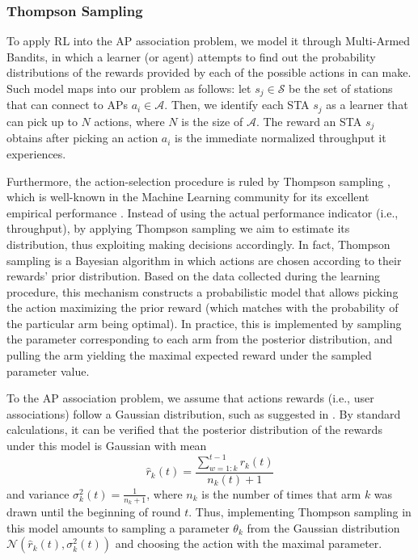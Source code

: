 \documentclass{article}
\begin{document}
		\subsubsection{Thompson Sampling}
		\label{section:thompson}			
			To apply RL into the AP association problem, we model it through Multi-Armed Bandits, in which a learner (or agent) attempts to find out the probability distributions of the rewards provided by each of the possible actions in can make. Such model maps into our problem as follows: let $s_j \in \mathcal{S}$ be the set of stations that can connect to APs $a_i \in \mathcal{A}$. Then, we identify each STA $s_j$ as a learner that can pick up to $N$ actions, where $N$ is the size of $\mathcal{A}$. The reward an STA $s_j$ obtains after picking an action $a_i$ is the immediate normalized throughput it experiences. 
			
			Furthermore, the action-selection procedure is ruled by Thompson sampling \cite{thompson1933likelihood}, which is well-known in the Machine Learning community for its excellent empirical performance \cite{CL11}. Instead of using the actual performance indicator (i.e., throughput), by applying Thompson sampling  we aim to estimate its distribution, thus exploiting making decisions accordingly. In fact, Thompson sampling is a Bayesian algorithm in which actions are chosen according to their rewards' prior distribution. Based on the data collected during the learning procedure, this mechanism constructs a probabilistic model that allows picking the action maximizing the prior reward (which matches with the probability of the particular arm being optimal). In practice, this is implemented by sampling the parameter corresponding to each arm from the posterior distribution, and pulling the arm yielding the maximal expected reward under the sampled parameter value.
			 
			To the AP association problem, we assume that actions rewards (i.e., user associations) follow a Gaussian distribution, such as suggested in \cite{agrawal2013further}. By standard calculations, it can be verified that the posterior distribution of the rewards under this model is Gaussian with mean 
			\begin{equation}
				\hat{r}_k(t) = \frac{\sum_{w=1:k}^{t-1} r_k(t) }{n_k(t) + 1}
				\nonumber
			\end{equation}
			and variance $\sigma_k^2(t) = \frac{1}{n_k + 1}$, where $n_k$ is the number of times that arm $k$ was drawn until the beginning of round $t$. Thus, implementing Thompson sampling in this model amounts to sampling a parameter $\theta_k$ from the Gaussian distribution $\mathcal{N}\left(\hat{r}_k(t),\sigma_k^2(t)\right)$ and choosing the action with the maximal parameter.   
			
\end{document}
